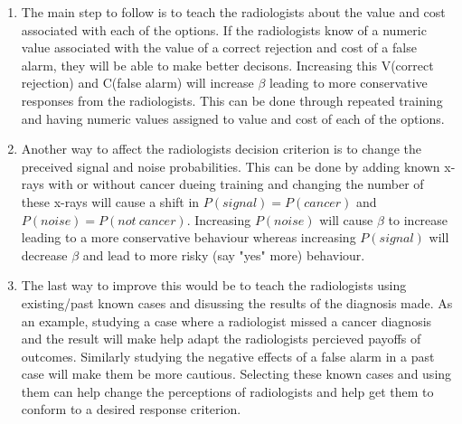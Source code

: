 \documentclass[12pt]{article}
\begin{document}
	\begin{enumerate}
		\item The main step to follow is to teach the radiologists about the value and cost associated with each of the options. If the radiologists know of a numeric value associated with the value of a correct rejection and cost of a false alarm, they will be able to make better decisons. Increasing this V(correct rejection) and C(false alarm) will increase $\beta$ leading to more conservative responses from the radiologists. This can be done through repeated training and having numeric values assigned to value and cost of each of the options.
		\item Another way to affect the radiologists decision criterion is to change the preceived signal and noise probabilities. This can be done by adding known x-rays with or without cancer dueing training and changing the number of these x-rays will cause a shift in $P(signal)=P(cancer)$ and $P(noise)=P(not\ cancer)$. Increasing $P(noise)$ will cause $\beta$ to increase leading to a more conservative behaviour whereas increasing $P(signal)$ will decrease $\beta$ and lead to more risky (say "yes" more) behaviour.
		\item The last way to improve this would be to teach the radiologists using existing/past known cases and disussing the results of the diagnosis made. As an example, studying a case where a radiologist missed a cancer diagnosis and the result will make help adapt the radiologists percieved payoffs of outcomes. Similarly studying the negative effects of a false alarm in a past case will make them be more cautious. Selecting these known cases and using them can help change the perceptions of radiologists and help get them to conform to a desired response criterion.
	\end{enumerate}
	
	
\end{document}
